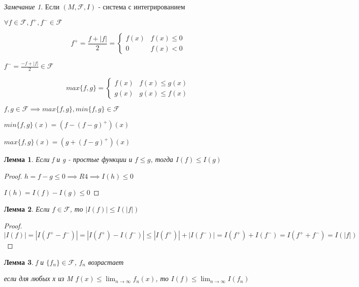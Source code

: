 \documentclass[a4paper]{article}
\newtheorem{lemma}{Лемма}[section]
\theoremstyle{definition}
\theoremstyle{remark}
\newtheorem*{remark}{Замечание}
\begin{document}
\begin{remark}
     Если $(M, \mathcal{F} , I)$ - система с интегрированием

     $\forall f\in \mathcal{F}, f^{+}, f^{-}\in \mathcal{F} $
     
     \begin{equation*}
          \text{$f^+ = \frac{f+|f|}{2} = $}
           \begin{cases}
             f(x) &\text{$f(x)\leq 0$} \\
             0 &\text{$f(x)< 0$}
           \end{cases}
     \end{equation*}

     $f^- = \frac{-f+|f|}{2} \in \mathcal{F}$

     \begin{equation*}
          \text{$max\{f, g\} = $}
           \begin{cases}
             f(x) &\text{$f(x)\leq g(x)$} \\
             g(x) &\text{$g(x)\leq f(x)$}
           \end{cases}
     \end{equation*}

     $f, g\in\mathcal{F} \implies max\{f, g\}, min\{f, g\}\in \mathcal{F} $

     $min\{f, g\}(x) = (f - (f-g)^+)(x)$

     $max\{f, g\}(x) = (g+(f-g)^+)(x)$
\end{remark}
\begin{lemma}
     Если f и g - простые функции и $f\leq g$, тогда $I(f)\leq I(g)$
\end{lemma}
\begin{proof}
     $h = f-g\leq 0 \implies R4 \implies I(h)\leq 0$

     $I(h) = I(f) - I(g)\leq 0$
\end{proof}
\begin{lemma}
     Если $f\in \mathcal{F} $, то $|I(f)|\leq I(|f|)$
\end{lemma}
\begin{proof}
     $|I(f)| = |I(f^+ - f^-)| = |I(f^+) - I(f^-)|\leq|I(f^+)| + |I(f^-)| = I(f^+) + I(f^-) = I(f^+ + f^-) = I(|f|)$
\end{proof}
\begin{lemma}
     f и $\{f_n\}\in \mathcal{F} $, $f_n$ возрастает

     если для любых х из M $f(x)\leq \lim_{n\to\infty}f_n(x)$, то $I(f)\leq \lim_{n\to\infty}I(f_n)$
\end{lemma}
\end{document}

